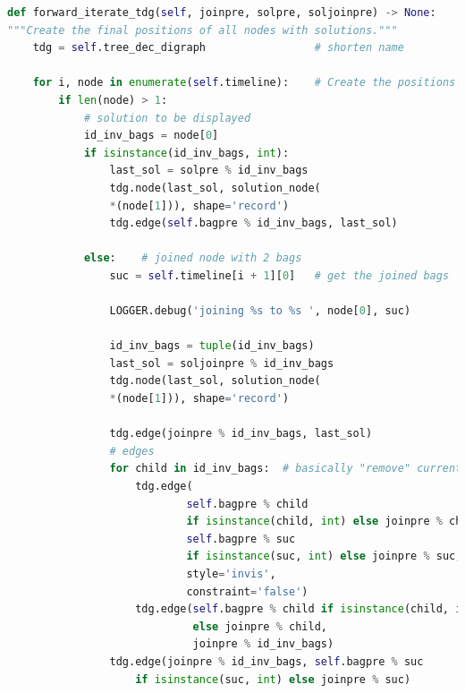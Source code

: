 \documentclass[a4paper, 12pt, bibliography=totoc]{scrartcl}
\begin{document}
\begin{lstlisting}[language={Python}, caption={forward\_iterate\_tdg}, label={lst:forward-iterate}]
def forward_iterate_tdg(self, joinpre, solpre, soljoinpre) -> None:
"""Create the final positions of all nodes with solutions."""
	tdg = self.tree_dec_digraph                 # shorten name
	
	for i, node in enumerate(self.timeline):    # Create the positions
		if len(node) > 1:
			# solution to be displayed
			id_inv_bags = node[0]
			if isinstance(id_inv_bags, int):
				last_sol = solpre % id_inv_bags
				tdg.node(last_sol, solution_node(
				*(node[1])), shape='record')	
				tdg.edge(self.bagpre % id_inv_bags, last_sol)
			
			else:    # joined node with 2 bags
				suc = self.timeline[i + 1][0]   # get the joined bags
				
				LOGGER.debug('joining %s to %s ', node[0], suc)
				
				id_inv_bags = tuple(id_inv_bags)
				last_sol = soljoinpre % id_inv_bags
				tdg.node(last_sol, solution_node(
				*(node[1])), shape='record')
				
				tdg.edge(joinpre % id_inv_bags, last_sol)
				# edges
				for child in id_inv_bags:  # basically "remove" current
					tdg.edge(
							self.bagpre % child
							if isinstance(child, int) else joinpre % child,
							self.bagpre % suc
							if isinstance(suc, int) else joinpre % suc,
							style='invis',
							constraint='false')
					tdg.edge(self.bagpre % child if isinstance(child, int)
					         else joinpre % child,
					         joinpre % id_inv_bags)
				tdg.edge(joinpre % id_inv_bags, self.bagpre % suc
					if isinstance(suc, int) else joinpre % suc)
\end{lstlisting}
\end{document}
